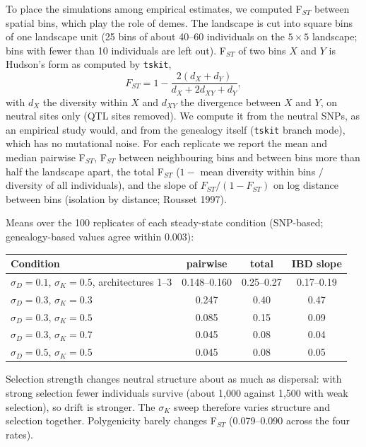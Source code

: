 To place the simulations among empirical estimates, we computed
F$_{ST}$ between spatial bins, which play the role of demes. The landscape
is cut into square bins of one landscape unit (25 bins of about 40--60
individuals on the $5\times5$ landscape; bins with fewer than 10
individuals are left out). F$_{ST}$ of two bins $X$ and $Y$ is Hudson's form
as computed by \texttt{tskit},
\begin{equation*}
F_{ST} = 1 - \frac{2(d_X + d_Y)}{d_X + 2d_{XY} + d_Y},
\end{equation*}
with $d_X$ the diversity within $X$ and $d_{XY}$ the divergence between $X$
and $Y$, on neutral sites only (QTL sites removed). We compute it from the
neutral SNPs, as an empirical study would, and from the genealogy itself
(\texttt{tskit} branch mode), which has no mutational noise. For each
replicate we report the mean and median pairwise F$_{ST}$, F$_{ST}$ between
neighbouring bins and between bins more than half the landscape apart, the
total F$_{ST}$ ($1 -$ mean diversity within bins $/$ diversity of all
individuals), and the slope of $F_{ST}/(1-F_{ST})$ on log distance between
bins (isolation by distance; Rousset 1997).

Means over the 100 replicates of each steady-state condition (SNP-based;
genealogy-based values agree within 0.003):

\begin{center}
\begin{tabular}{lccc}
\toprule
Condition & pairwise & total & IBD slope \\
\midrule
$\sigma_D=0.1$, $\sigma_K=0.5$, architectures 1--3 & 0.148--0.160 & 0.25--0.27 & 0.17--0.19 \\
$\sigma_D=0.3$, $\sigma_K=0.3$ & 0.247 & 0.40 & 0.47 \\
$\sigma_D=0.3$, $\sigma_K=0.5$ & 0.085 & 0.15 & 0.09 \\
$\sigma_D=0.3$, $\sigma_K=0.7$ & 0.045 & 0.08 & 0.04 \\
$\sigma_D=0.5$, $\sigma_K=0.5$ & 0.045 & 0.08 & 0.05 \\
\bottomrule
\end{tabular}
\end{center}

\noindent Selection strength changes neutral structure about as much as
dispersal: with strong selection fewer individuals survive (about 1,000
against 1,500 with weak selection), so drift is stronger. The $\sigma_K$
sweep therefore varies structure and selection together. Polygenicity
barely changes F$_{ST}$ (0.079--0.090 across the four rates).

